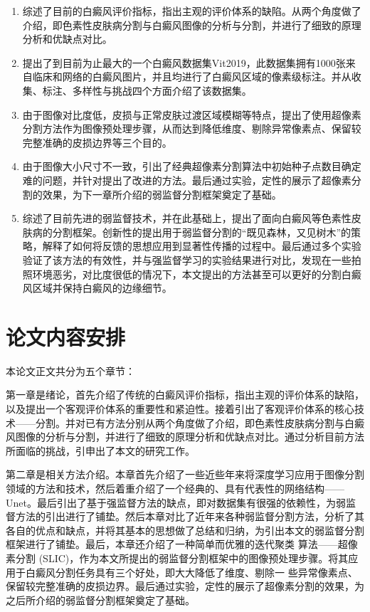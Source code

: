 \begin{enumerate}
\item 综述了目前的白癜风评价指标，指出主观的评价体系的缺陷。从两个角度做了介绍，即色素性皮肤病分割与白癜风图像的分析与分割，并进行了细致的原理分析和优缺点对比。
\item 提出了到目前为止最大的一个白癜风数据集Vit2019，此数据集拥有1000张来自临床和网络的白癜风图片，并且均进行了白癜风区域的像素级标注。并从收集、标注、多样性与挑战四个方面介绍了该数据集。
\item 由于图像对比度低，皮损与正常皮肤过渡区域模糊等特点，提出了使用超像素分割方法作为图像预处理步骤，从而达到降低维度、剔除异常像素点、保留较完整准确的皮损边界等三个目的。
\item 由于图像大小尺寸不一致，引出了经典超像素分割算法中初始种子点数目确定难的问题，并针对提出了改进的方法。最后通过实验，定性的展示了超像素分割的效果，为下一章所介绍的弱监督分割框架奠定了基础。
\item 综述了目前先进的弱监督技术，并在此基础上，提出了面向白癜风等色素性皮肤病的分割框架。创新性的提出用于弱监督分割的“既见森林，又见树木”的策略，解释了如何将反馈的思想应用到显著性传播的过程中。最后通过多个实验验证了该方法的有效性，并与强监督学习的实验结果进行对比，发现在一些拍照环境恶劣，对比度很低的情况下，本文提出的方法甚至可以更好的分割白癜风区域并保持白癜风的边缘细节。
\end{enumerate}

\section{论文内容安排}
本论文正文共分为五个章节：

第一章是绪论，首先介绍了传统的白癜风评价指标，指出主观的评价体系的缺陷，以及提出一个客观评价体系的重要性和紧迫性。接着引出了客观评价体系的核心技术——分割。并对已有方法分别从两个角度做了介绍，即色素性皮肤病分割与白癜风图像的分析与分割，并进行了细致的原理分析和优缺点对比。通过分析目前方法所面临的挑战，引申出了本文的研究工作。

第二章是相关方法介绍。本章首先介绍了一些近些年来将深度学习应用于图像分割领域的方法和技术，然后着重介绍了一个经典的、具有代表性的网络结构——Unet。最后引出了基于强监督方法的缺点，即对数据集有很强的依赖性，为弱监督方法的引出进行了铺垫。然后本章对比了近年来各种弱监督分割方法，分析了其各自的优点和缺点，并将其基本的思想做了总结和归纳，为引出本文的弱监督分割框架进行了铺垫。最后，本章还介绍了一种简单而优雅的迭代聚类 算法——超像素分割 (SLIC)，作为本文所提出的弱监督分割框架中的图像预处理步骤。将其应用于白癜风分割任务具有三个好处，即大大降低了维度、剔除一 些异常像素点、保留较完整准确的皮损边界。最后通过实验，定性的展示了超像素分割的效果，为之后所介绍的弱监督分割框架奠定了基础。


